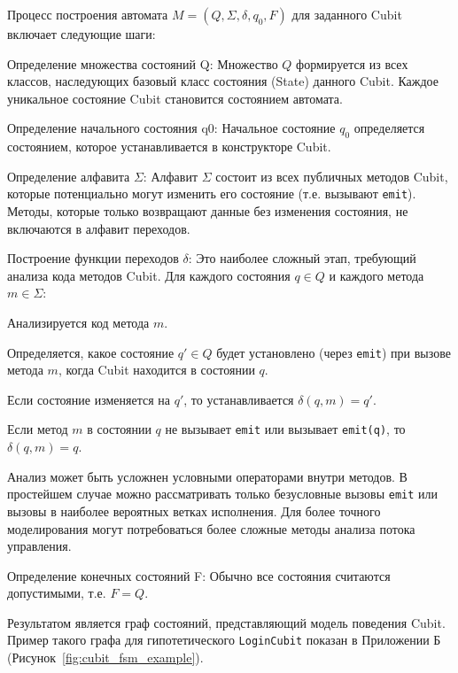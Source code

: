 \documentclass[14pt, russian]{scrartcl}
\begin{document}
Процесс построения автомата $M = (Q, \Sigma, \delta, q_0, F)$ для заданного Cubit включает следующие шаги:

\begin{enumerate*}
    \item {Определение множества состояний Q:} Множество $Q$ формируется из всех классов, наследующих базовый класс состояния (State) данного Cubit. Каждое уникальное состояние Cubit становится состоянием автомата.
    \item {Определение начального состояния q0:} Начальное состояние $q_0$ определяется состоянием, которое устанавливается в конструкторе Cubit.
    \item {Определение алфавита $\Sigma$:} Алфавит $\Sigma$ состоит из всех публичных методов Cubit, которые потенциально могут изменить его состояние (т.е. вызывают \texttt{emit}). Методы, которые только возвращают данные без изменения состояния, не включаются в алфавит переходов.
    \item {Построение функции переходов $\delta$:} Это наиболее сложный этап, требующий анализа кода методов Cubit. Для каждого состояния $q \in Q$ и каждого метода $m \in \Sigma$:
        \begin{itemize*}
            \item Анализируется код метода $m$.
            \item Определяется, какое состояние $q' \in Q$ будет установлено (через \texttt{emit}) при вызове метода $m$, когда Cubit находится в состоянии $q$.
            \item Если состояние изменяется на $q'$, то устанавливается $\delta(q, m) = q'$.
            \item Если метод $m$ в состоянии $q$ не вызывает \texttt{emit} или вызывает \texttt{emit(q)}, то $\delta(q, m) = q$.
            \item Анализ может быть усложнен условными операторами внутри методов. В простейшем случае можно рассматривать только безусловные вызовы \texttt{emit} или вызовы в наиболее вероятных ветках исполнения. Для более точного моделирования могут потребоваться более сложные методы анализа потока управления.
        \end{itemize*}
    \item {Определение конечных состояний F:} Обычно все состояния считаются допустимыми, т.е. $F = Q$.
\end{enumerate*}

Результатом является граф состояний, представляющий модель поведения Cubit. Пример такого графа для гипотетического \texttt{LoginCubit} показан в Приложении Б (Рисунок~\ref{fig:cubit_fsm_example}).
\end{document}
